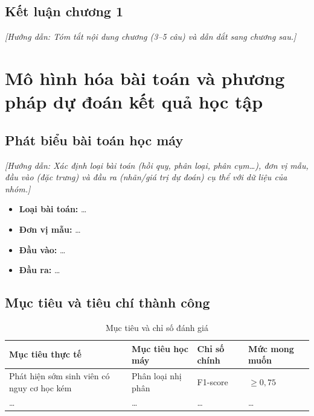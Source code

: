\documentclass[12pt,a4paper,oneside]{report}
\newcommand{\tenbaitoan}{dự đoán kết quả học tập} %
\newcommand{\huongdan}[1]{{\color{guide}\itshape [Hướng dẫn: #1]}}
\begin{document}
\section{Kết luận chương 1}
\huongdan{Tóm tắt nội dung chương (3--5 câu) và dẫn dắt sang chương sau.}

\chapter{Mô hình hóa bài toán và phương pháp \tenbaitoan}
\label{chap:phuongphap}

\section{Phát biểu bài toán học máy}
\huongdan{Xác định loại bài toán (hồi quy, phân loại, phân cụm\dots), đơn vị
mẫu, đầu vào (đặc trưng) và đầu ra (nhãn/giá trị dự đoán) cụ thể với dữ liệu
của nhóm.}

\begin{itemize}
  \item \textbf{Loại bài toán:} \dots
  \item \textbf{Đơn vị mẫu:} \dots
  \item \textbf{Đầu vào:} \dots
  \item \textbf{Đầu ra:} \dots
\end{itemize}

\section{Mục tiêu và tiêu chí thành công}

\begin{table}[H]
  \centering
  \caption{Mục tiêu và chỉ số đánh giá}
  \label{tab:muctieu}
  \begin{tabularx}{\textwidth}{>{\raggedright\arraybackslash}X >{\raggedright\arraybackslash}X
                               >{\centering\arraybackslash}p{2.8cm} >{\centering\arraybackslash}p{2.8cm}}
    \toprule
    \textbf{Mục tiêu thực tế} & \textbf{Mục tiêu học máy} & \textbf{Chỉ số chính} & \textbf{Mức mong muốn} \\
    \midrule
    Phát hiện sớm sinh viên có nguy cơ học kém & Phân loại nhị phân & F1-score & $\geq 0{,}75$ \\
    \dots & \dots & \dots & \dots \\
    \bottomrule
  \end{tabularx}
\end{table}
\end{document}
